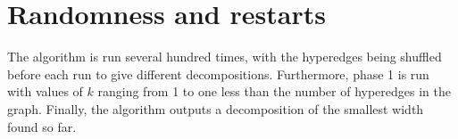 \documentclass[a4paper,UKenglish,cleveref, autoref]{lipics-v2019}
\begin{document}
\section{Randomness and restarts}

The algorithm is run several hundred times, with the hyperedges being shuffled before each run to give different decompositions.  Furthermore, phase 1 is run with values of $k$ ranging from 1 to one less than the number of hyperedges in the graph.  Finally, the algorithm outputs a decomposition of the smallest width found so far.

%
%
%
%
%
%
\end{document}
